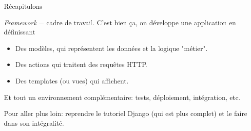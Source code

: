 \begin{frame}{Récapitulons}

\textit{Framework} = cadre de travail. C'est bien ça, on développe une application
en définissant

\begin{itemize}
  \item Des \alert{modèles}, qui représentent les données et la logique "métier".
  \item Des \alert{actions} qui traitent des requêtes HTTP.
  \item Des \alert{templates} (ou vues) qui affichent.
\end{itemize}

\vfill
Et tout un environnement complémentaire: tests, déploiement, intégration, etc.


\vfill

Pour aller plus loin: reprendre le tutoriel Django (qui est plus complet) et le faire
dans son intégralité.



\end{frame}